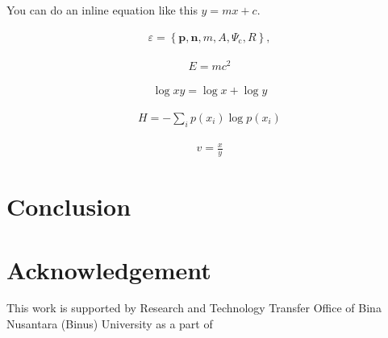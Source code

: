 \documentclass[conference, a4paper]{IEEEtran}
\begin{document}
You can do an inline equation like this $y = mx + c$.

    \begin{align}\label{eq:elementalobject}
      \varepsilon = \left\{ \mathbf{p}, \mathbf{n}, m, A, \Psi_\text{c}, R \right\},
    \end{align}
    
    \begin{align*}
      E = mc^2
    \end{align*}

    \begin{align*}
      \log xy = \log x + \log y
    \end{align*}
    
    \begin{align*}
      H = - \sum_i p(x_i) \log p(x_i)
    \end{align*}
    
    \begin{align*}
      v = \frac{x}{y}
    \end{align*}



\section{Conclusion}
\label{sec:conclusion}

\lipsum[3]



\section*{Acknowledgement}
This work is supported by Research and Technology Transfer Office of Bina Nusantara (Binus) University as a part of



\end{document}
